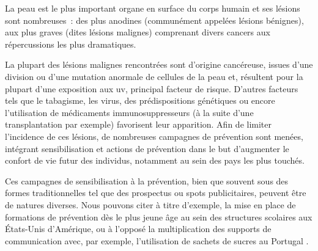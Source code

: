 \renewcommand{\thechapter}{\roman{chapter}}
\setcounter{chapter}{1}
\setcounter{figure}{0}

\label{chap:introduction}
La peau est le plus important organe en surface du corps humain et ses lésions sont nombreuses~: des plus anodines (communément appelées lésions bénignes), aux plus graves (dites lésions malignes) comprenant divers cancers aux répercussions les plus dramatiques.\par

La plupart des lésions malignes rencontrées sont d’origine cancéreuse, issues d’une division ou d’une mutation anormale de cellules de la peau et, résultent pour la plupart d’une exposition aux \gls{uv}, principal facteur de risque. D’autres facteurs tels que le tabagisme, les virus, des prédispositions génétiques ou encore l’utilisation de médicaments immunosuppresseurs (à la suite d'une transplantation par exemple) favorisent leur apparition. Afin de limiter l’incidence de ces lésions, de nombreuses campagnes de prévention sont menées, intégrant sensibilisation et actions de prévention dans le but d’augmenter le confort de vie futur des individus, notamment au sein des pays les plus touchés.\par

Ces campagnes de sensibilisation à la prévention, bien que souvent sous des formes traditionnelles tel que des prospectus ou spots publicitaires, peuvent être de natures diverses. Nous pouvons citer à titre d’exemple, la mise en place de formations de prévention dès le plus jeune âge au sein des structures scolaires aux États-Unis d’Amérique, ou à l’opposé la multiplication des supports de communication avec, par exemple, l’utilisation de sachets de sucres au Portugal \cite{Correia2017,Guy2016}.\par 

